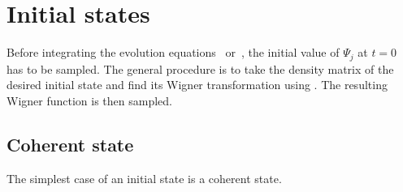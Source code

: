 \section{Initial states}

Before integrating the evolution equations~ or~, the initial value of $\Psi_j$ at $t=0$ has to be sampled.
The general procedure is to take the density matrix of the desired initial state and find its Wigner transformation using .
The resulting Wigner function is then sampled.


\subsection{Coherent state}

The simplest case of an initial state is a coherent state.

